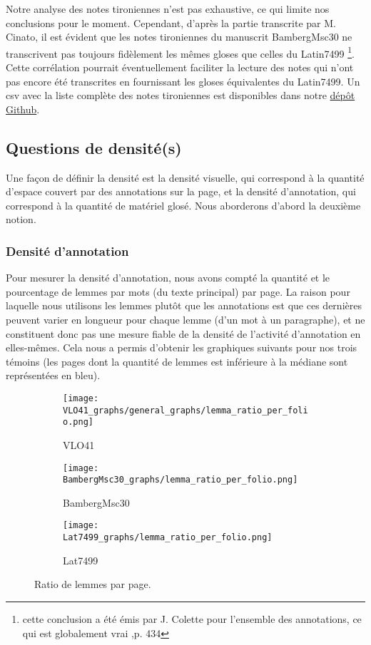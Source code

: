 \documentclass[a4paper, twoside, 12pt]{book}
\begin{document}
{Notre analyse des notes tironiennes n'est pas exhaustive, ce qui limite nos conclusions pour le moment. Cependant, d'après la partie transcrite par M. Cinato, il est évident que les notes tironiennes du manuscrit BambergMsc30 ne transcrivent pas toujours fidèlement les mêmes gloses que celles du Latin7499 \footnote{cette conclusion a été émis par J. Colette pour l'ensemble des annotations, ce qui est globalement vrai \cite{jeudy1974manuscrits},p. 434}. Cette corrélation pourrait éventuellement faciliter la lecture des notes qui n'ont pas encore été transcrites en fournissant les \og{}gloses équivalentes\fg{} du Latin7499. Un csv avec la liste complète des notes tironiennes est disponibles dans notre \href{https://github.com/malamatenia/Eutyches/tree/main/comparative_mss_analysis}{dépôt Github}. \\


\subsection{Questions de densité(s)}


Une façon de définir la densité est la densité visuelle, qui correspond à la quantité d'espace couvert par des annotations sur la page, et la densité d'annotation, qui correspond à la quantité de matériel glosé. Nous aborderons d'abord la deuxième notion.\\

\subsubsection{Densité d'annotation}

Pour mesurer la densité d'annotation, nous avons compté la quantité et le pourcentage de lemmes par mots (du texte principal) par page. La raison pour laquelle nous utilisons les lemmes plutôt que les annotations est que ces dernières peuvent varier en longueur pour chaque lemme (d'un mot à un paragraphe), et ne constituent donc pas une mesure fiable de la densité de l'activité d'annotation en elles-mêmes. Cela nous a permis d'obtenir les graphiques suivants pour nos trois témoins (les pages dont la quantité de lemmes est inférieure à la médiane sont représentées en bleu). \\


\begin{figure}[H]
  \centering
  \begin{subfigure}[b]{0.3\textwidth}
    \centering
    \texttt{[image: VLO41\_graphs/general\_graphs/lemma\_ratio\_per\_folio.png]}
    \caption{VLO41}
  \end{subfigure}%
  \hfill
  \begin{subfigure}[b]{0.3\textwidth}
    \centering
    \texttt{[image: BambergMsc30\_graphs/lemma\_ratio\_per\_folio.png]}
    \caption{BambergMsc30}
  \end{subfigure}%
  \hfill
  \begin{subfigure}[b]{0.3\textwidth}
    \centering
    \texttt{[image: Lat7499\_graphs/lemma\_ratio\_per\_folio.png]}
    \caption{Lat7499}
  \end{subfigure}
  \caption{Ratio de lemmes par page.}
\end{figure}


}
\end{document}
